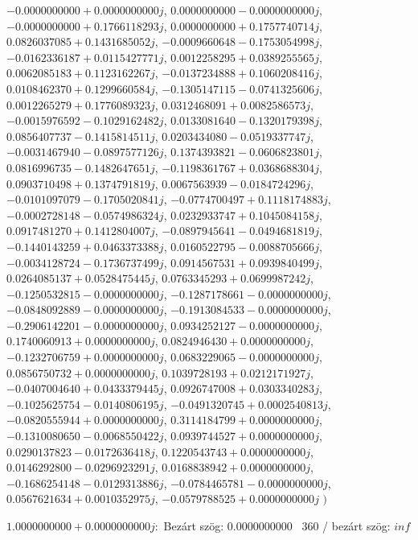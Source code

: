 \documentclass[14pt,a4paper]{article}
\begin{document}
\begin{itemize}
$-0.0000000000+0.0000000000j$, $0.0000000000-0.0000000000j$, $-0.0000000000+0.1766118293j$, $0.0000000000+0.1757740714j$, $0.0826037085+0.1431685052j$, $-0.0009660648-0.1753054998j$, $-0.0162336187+0.0115427771j$, $0.0012258295+0.0389255565j$, $0.0062085183+0.1123162267j$, $-0.0137234888+0.1060208416j$, $0.0108462370+0.1299660584j$, $-0.1305147115-0.0741325606j$, $0.0012265279+0.1776089323j$, $0.0312468091+0.0082586573j$, $-0.0015976592-0.1029162482j$, $0.0133081640-0.1320179398j$, $0.0856407737-0.1415814511j$, $0.0203434080-0.0519337747j$, $-0.0031467940-0.0897577126j$, $0.1374393821-0.0606823801j$, $0.0816996735-0.1482647651j$, $-0.1198361767+0.0368688304j$, $0.0903710498+0.1374791819j$, $0.0067563939-0.0184724296j$, $-0.0101097079-0.1705020841j$, $-0.0774700497+0.1118174883j$, $-0.0002728148-0.0574986324j$, $0.0232933747+0.1045084158j$, $0.0917481270+0.1412804007j$, $-0.0897945641-0.0494681819j$, $-0.1440143259+0.0463373388j$, $0.0160522795-0.0088705666j$, $-0.0034128724-0.1736737499j$, $0.0914567531+0.0939840499j$, $0.0264085137+0.0528475445j$, $0.0763345293+0.0699987242j$, $-0.1250532815-0.0000000000j$, $-0.1287178661-0.0000000000j$, $-0.0848092889-0.0000000000j$, $-0.1913084533-0.0000000000j$, $-0.2906142201-0.0000000000j$, $0.0934252127-0.0000000000j$, $0.1740060913+0.0000000000j$, $0.0824946430+0.0000000000j$, $-0.1232706759+0.0000000000j$, $0.0683229065-0.0000000000j$, $0.0856750732+0.0000000000j$, $0.1039728193+0.0212171927j$, $-0.0407004640+0.0433379445j$, $0.0926747008+0.0303340283j$, $-0.1025625754-0.0140806195j$, $-0.0491320745+0.0002540813j$, $-0.0820555944+0.0000000000j$, $0.3114184799+0.0000000000j$, $-0.1310080650-0.0068550422j$, $0.0939744527+0.0000000000j$, $0.0290137823-0.0172636418j$, $0.1220543743+0.0000000000j$, $0.0146292800-0.0296923291j$, $0.0168838942+0.0000000000j$, $-0.1686254148-0.0129313886j$, $-0.0784465781-0.0000000000j$, $0.0567621634+0.0010352975j$, $-0.0579788525+0.0000000000j$
$\big)$
\end{itemize}
$1.0000000000+0.0000000000j$:\
Bezárt szög: $0.0000000000$ \
360 / bezárt szög: $inf$\
\end{document}
